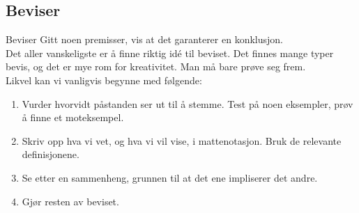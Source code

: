 \subsection*{Beviser}

\begin{frame}{Beviser}
    Gitt noen premisser, vis at det garanterer en konklusjon.\\

    Det aller vanskeligste er å finne riktig idé til beviset. Det finnes mange typer bevis, og det er mye rom for kreativitet. Man må bare prøve seg frem.\\
    
    \pause
    Likvel kan vi vanligvis begynne med følgende:
    \begin{enumerate}
        \item Vurder hvorvidt påstanden ser ut til å stemme. Test på noen eksempler, prøv å finne et moteksempel.
        \pause
        \item Skriv opp hva vi vet, og hva vi vil vise, i mattenotasjon. Bruk de relevante definisjonene.
        \pause
        \item Se etter en sammenheng, grunnen til at det ene impliserer det andre.
        \pause
        \item Gjør resten av beviset.
    \end{enumerate}
\end{frame}

